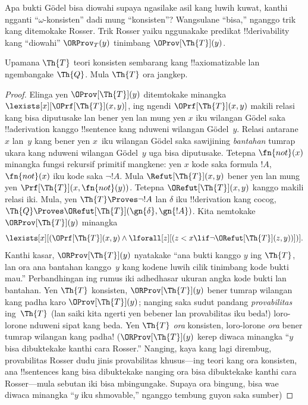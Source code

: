 \documentclass[../../../include/open-logic-section]{subfiles}
\begin{document}


Apa bukti G\"odel bisa diowahi supaya ngasilake asil kang luwih kuwat,
kanthi ngganti ``$\omega$-konsisten'' dadi mung ``konsisten''?
Wangsulane ``bisa,'' nganggo trik kang ditemokake Rosser. Trik
Rosser yaiku nggunakake predikat !!{derivability} kang
``diowahi'' $\ORProv_T(y)$ tinimbang $\OProv[\Th{T}](y)$.

\begin{thm}
Upamana $\Th{T}$ teori konsisten sembarang kang !!{axiomatizable}
lan ngembangake $\Th{Q}$. Mula $\Th{T}$ ora jangkep.
\end{thm}

\begin{proof}
Elinga yen $\OProv[\Th{T}](y)$ ditemtokake minangka
$\lexists[x][\OPrf[\Th{T}](x, y)]$, ing ngendi
$\OPrf[\Th{T}](x, y)$ makili relasi kang bisa diputusake
lan bener yen lan mung yen $x$ iku wilangan G\"odel saka
!!a{derivation} kanggo !!{sentence} kang nduweni wilangan
G\"odel~$y$. Relasi antarane $x$ lan~$y$ kang bener yen $x$~iku
wilangan G\"odel saka sawijining \emph{bantahan} tumrap ukara kang
nduweni wilangan G\"odel~$y$ uga bisa diputusake. Tetepna
$\fn{not}(x)$ minangka fungsi rekursif primitif mangkene: yen $x$
kode saka formula $!A$, $\fn{not}(x)$ iku kode saka $\lnot !A$.
Mula $\Refut[\Th{T}](x, y)$ bener yen lan mung yen
$\Prf[\Th{T}](x, \fn{not}(y))$. Tetepna
$\ORefut[\Th{T}](x, y)$ kanggo makili relasi iki. Mula,
yen $\Th{T} \Proves \lnot !A$ lan $\delta$ iku !!{derivation}
kang cocog, $\Th{Q} \Proves \ORefut[\Th{T}](\gn{\delta}, \gn{!A})$.
Kita nemtokake $\ORProv[\Th{T}](y)$ minangka
\[
\lexists[x][(\OPrf[\Th{T}](x,y) \land \lforall[z][(z < x \lif \lnot
  \ORefut[\Th{T}](z,y))])].
\]
Kanthi kasar, $\ORProv[\Th{T}](y)$ nyatakake ``ana bukti kanggo
$y$ ing $\Th{T}$, lan ora ana bantahan kanggo~$y$ kang kodene luwih
cilik tinimbang kode bukti mau.'' Perbandhingan ing rumus iki adhedhasar ukuran angka kode bukti lan bantahan.
Yen $\Th{T}$ konsisten, $\ORProv[\Th{T}](y)$ bener tumrap wilangan kang
padha karo $\OProv[\Th{T}](y)$; nanging saka sudut pandang
\emph{provabilitas} ing~$\Th{T}$ (lan saiki kita ngerti yen bebener lan
provabilitas iku beda!) loro-lorone nduweni sipat kang beda. Yen
$\Th{T}$ \emph{ora} konsisten, loro-lorone \emph{ora} bener tumrap
wilangan kang padha!{} ($\ORProv[\Th{T}](y)$ kerep diwaca minangka
``$y$ bisa dibuktekake kanthi cara Rosser.'' Nanging, kaya kang
lagi dirembug, provabilitas Rosser dudu jinis provabilitas khusus---ing
teori kang ora konsisten, ana !!{sentence}s kang bisa dibuktekake
nanging ora bisa dibuktekake kanthi cara Rosser---mula sebutan iki
bisa mbingungake. Supaya ora bingung, bisa wae diwaca minangka
``$y$ iku shmovable,'' nganggo tembung guyon saka sumber)


\end{proof}
\end{document}
